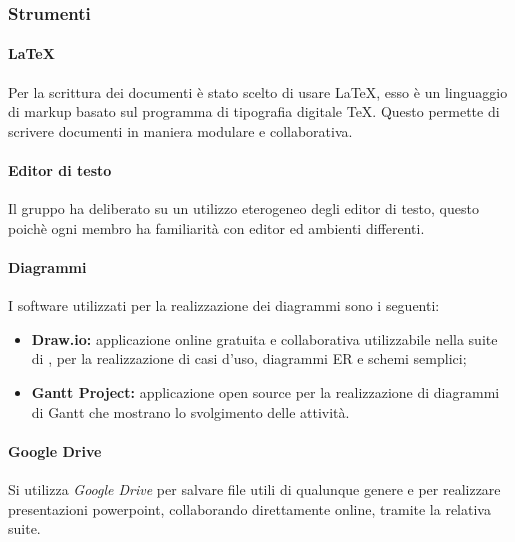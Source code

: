 		\subsubsection{Strumenti}
			\paragraph{LaTeX}
				Per la scrittura dei documenti è stato scelto di usare \LaTeX{}, esso è un linguaggio di markup basato sul programma di tipografia digitale \TeX{}. Questo permette di scrivere documenti in maniera modulare e collaborativa.
			\paragraph{Editor di testo}
				Il gruppo ha deliberato su un utilizzo eterogeneo degli editor di testo, questo poichè ogni membro ha familiarità con editor ed ambienti differenti.
			\paragraph{Diagrammi}
				I software utilizzati per la realizzazione dei diagrammi sono i seguenti:
				\begin{itemize}
					\item \textbf{Draw.io:} applicazione online gratuita e collaborativa utilizzabile nella suite di , per la realizzazione di casi d'uso, diagrammi ER e schemi semplici;
					\item \textbf{Gantt Project:} applicazione open source per la realizzazione di diagrammi di Gantt che mostrano lo svolgimento delle attività.
				\end{itemize}
			\paragraph{Google Drive}
				Si utilizza \textit{Google Drive} per salvare file utili di qualunque genere e per realizzare presentazioni powerpoint, collaborando direttamente online, tramite la relativa suite.
